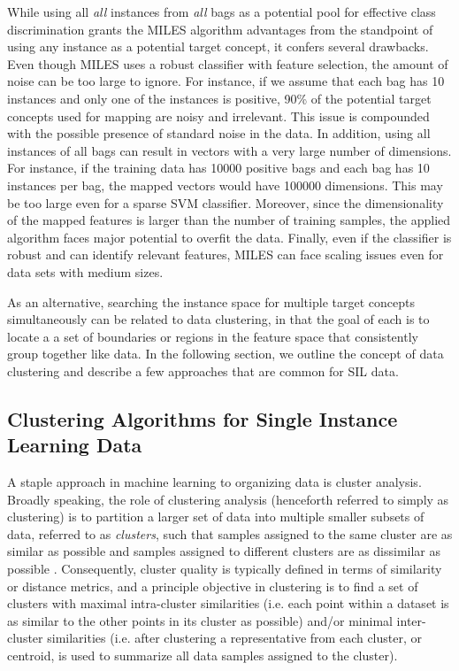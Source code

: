 \documentclass[12pt,dvips]{report}
\numberwithin{equation}{section}
\begin{document}
While using all \emph{all} instances from \emph{all} bags as a potential pool for effective class discrimination grants the MILES algorithm advantages from the standpoint of using any instance as a potential target concept, it confers several drawbacks.  Even though MILES uses a robust classifier with feature selection, the amount of noise can be too large to ignore.  For instance, if we assume that each bag has 10 instances and only one of the instances is positive, 90\% of the potential target concepts used for mapping are noisy and irrelevant.  This issue is compounded with the possible presence of standard noise in the data.  In addition, using all instances of all bags can result in vectors with a very large number of dimensions.  For instance, if the training data has 10000 positive bags and each bag has 10 instances per bag, the mapped vectors would have 100000 dimensions.  This may be too large even for a sparse SVM classifier.  Moreover, since the dimensionality of the mapped features is larger than the number of training samples, the applied algorithm faces major potential to overfit the data.   Finally, even if the classifier is robust and can identify relevant features, MILES can face scaling issues even for data sets with medium sizes.

As an alternative, searching the instance space for multiple target concepts simultaneously can be related to data clustering, in that the goal of each is to locate a a set of boundaries or regions in the feature space that consistently group together like data.  In the following section, we outline the concept of data clustering and describe a few approaches that are common for SIL data.

\subsection{Clustering Algorithms for Single Instance Learning Data}

A staple approach in machine learning to organizing data is cluster analysis.  Broadly speaking, the role of clustering analysis (henceforth referred to simply as clustering) is to partition a larger set of data into multiple smaller subsets of data, referred to as \emph{clusters}, such that samples assigned to the same cluster are as similar as possible and samples assigned to different clusters are as dissimilar as possible \cite{tryon1939cluster,driver1932quantitative,bishop2006pattern}.  Consequently, cluster quality is typically defined in terms of similarity or distance metrics, and a principle objective in clustering is to find a set of clusters with maximal intra-cluster similarities (i.e. each point within a dataset is as similar to the other points in its cluster as possible) and/or minimal inter-cluster similarities (i.e. after clustering a representative from each cluster, or centroid, is used to summarize all data samples assigned to the cluster).  
\end{document}
